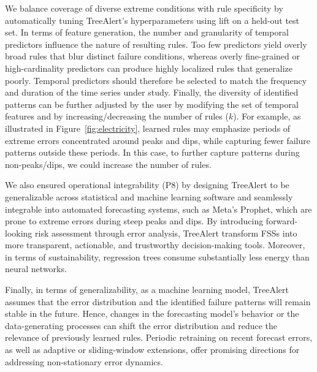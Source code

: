 \documentclass[]{interact}
\theoremstyle{plain}
\theoremstyle{definition}
\theoremstyle{remark}
\begin{document}
We balance coverage of diverse extreme conditions with rule specificity by automatically tuning TreeAlert's hyperparameters using lift on a held-out test set. In terms of feature generation, the number and granularity of temporal predictors influence the nature of resulting rules. Too few predictors yield overly broad rules that blur distinct failure conditions, whereas overly fine-grained or high-cardinality predictors can produce highly localized rules that generalize poorly. Temporal predictors should therefore be selected to match the frequency and duration of the time series under study. Finally, the diversity of identified patterns can be further adjusted by the user by modifying the set of temporal features and by increasing/decreasing the number of rules ($k$). For example, as illustrated in Figure~\ref{fig:electricity}, learned rules may emphasize periods of extreme errors concentrated around peaks and dips, while capturing fewer failure patterns outside these periods. In this case, to further capture patterns during non-peaks/dips, we could increase the number of rules.

We also ensured operational integrability (P8) by designing TreeAlert to be generalizable across statistical and machine learning software and seamlessly integrable into automated forecasting systems, such as Meta's Prophet, which are prone to extreme errors during steep peaks and dips. By introducing forward-looking risk assessment through error analysis, TreeAlert transform FSSs into more transparent, actionable, and trustworthy decision-making tools. Moreover, in terms of sustainability, regression trees consume substantially less energy than neural networks.

Finally, in terms of generalizability, as a machine learning model, TreeAlert assumes that the error distribution and the identified failure patterns will remain stable in the future. Hence, changes in the forecasting model's behavior or the data-generating processes can shift the error distribution and reduce the relevance of previously learned rules. Periodic retraining on recent forecast errors, as well as adaptive or sliding-window extensions, offer promising directions for addressing non-stationary error dynamics.
\end{document}
